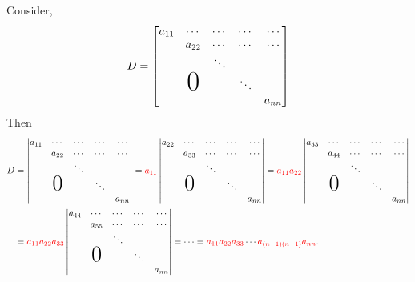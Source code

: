 \documentclass[reqno]{amsart}
\theoremstyle{definition}
\newenvironment{handwave}{%
  \renewcommand{\proofname}{Handwavey proof}\proof}{\endproof}
\begin{document}
\begin{enumerate}
\begin{handwave}
Consider,
%
\begin{equation*}
D = \begin{bmatrix}
a_{11} & \cdots & \cdots & \cdots & \cdots \\
 & a_{22} & \cdots & \cdots & \cdots \\
 & & \ddots & & \\
 &\bigzero & & \ddots &  \\
 & & & & a_{nn}
\end{bmatrix}
\end{equation*}
%
Then
%
\begin{align*}
D &= \begin{vmatrix}
a_{11} & \cdots & \cdots & \cdots & \cdots \\
 & a_{22} & \cdots & \cdots & \cdots \\
 & & \ddots & & \\
 &\bigzero & & \ddots &  \\
 & & & & a_{nn}
\end{vmatrix} = {\color{red}a_{11}}\begin{vmatrix}
a_{22} & \cdots & \cdots & \cdots & \cdots \\
 & a_{33} & \cdots & \cdots & \cdots \\
 & & \ddots & & \\
 &\bigzero & & \ddots &  \\
 & & & & a_{nn}
\end{vmatrix} = {\color{red}a_{11}}{\color{red}a_{22}}\begin{vmatrix}
a_{33} & \cdots & \cdots & \cdots & \cdots \\
 & a_{44} & \cdots & \cdots & \cdots \\
 & & \ddots & & \\
 &\bigzero & & \ddots &  \\
 & & & & a_{nn}
\end{vmatrix}\\
&= {\color{red}a_{11}}{\color{red}a_{22}}{\color{red}a_{33}}\begin{vmatrix}
a_{44} & \cdots & \cdots & \cdots & \cdots \\
 & a_{55} & \cdots & \cdots & \cdots \\
 & & \ddots & & \\
 &\bigzero & & \ddots &  \\
 & & & & a_{nn}
 \end{vmatrix}
 = \cdots = {\color{red}a_{11}}{\color{red}a_{22}}{\color{red}a_{33}}\cdots{\color{red}a_{(n-1)(n-1)}}{\color{red}a_{nn}}.
\end{align*}


\end{handwave}
\end{enumerate}
\end{document}
